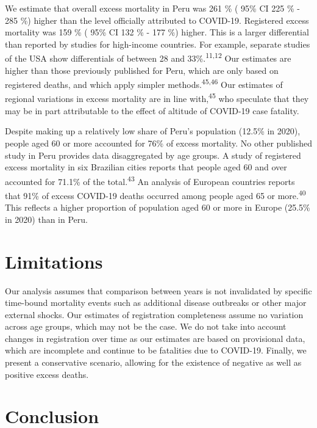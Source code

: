 \documentclass[
]{article}
\begin{document}
We estimate that overall excess mortality in Peru was 261 \% ( 95\% CI 225 \% - 285 \%) higher than the level officially attributed to COVID-19. Registered excess mortality was 159 \% ( 95\% CI 132 \% - 177 \%) higher. This is a larger differential than reported by studies for high-income countries. For example, separate studies of the USA show differentials of between 28 and 33\%.\textsuperscript{11,12} Our estimates are higher than those previously published for Peru, which are only based on registered deaths, and which apply simpler methods.\textsuperscript{45,46} Our estimates of regional variations in excess mortality are in line with,\textsuperscript{45} who speculate that they may be in part attributable to the effect of altitude of COVID-19 case fatality.

Despite making up a relatively low share of Peru's population (12.5\% in 2020), people aged 60 or more accounted for 76\% of excess mortality. No other published study in Peru provides data disaggregated by age groups. A study of registered excess mortality in six Brazilian cities reports that people aged 60 and over accounted for 71.1\% of the total.\textsuperscript{43} An analysis of European countries reports that 91\% of excess COVID-19 deaths occurred among people aged 65 or more.\textsuperscript{40} This reflects a higher proportion of population aged 60 or more in Europe (25.5\% in 2020) than in Peru.

\hypertarget{limitations}{%
\section{Limitations}\label{limitations}}

Our analysis assumes that comparison between years is not invalidated by specific time-bound mortality events such as additional disease outbreaks or other major external shocks. Our estimates of registration completeness assume no variation across age groups, which may not be the case. We do not take into account changes in registration over time as our estimates are based on provisional data, which are incomplete and continue to be fatalities due to COVID-19. Finally, we present a conservative scenario, allowing for the existence of negative as well as positive excess deaths.

\hypertarget{conclusion}{%
\section{Conclusion}\label{conclusion}}
\end{document}
